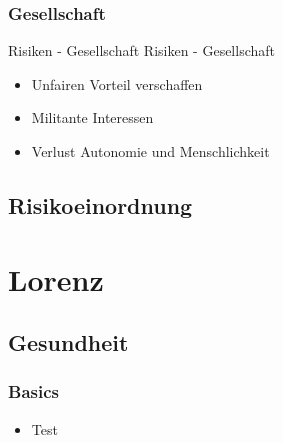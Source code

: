 \documentclass[aspectratio=169,16pt,xcolor=table]{beamer}
\begin{document}
\subsubsection{Gesellschaft}
\begin{frame}{Risiken - Gesellschaft}
Risiken - Gesellschaft
	\begin{itemize}
		\item{Unfairen Vorteil verschaffen~\cite{khan_aziz_2019}}
		\item{Militante Interessen~\cite{khan_aziz_2019}}
		\item{Verlust Autonomie und Menschlichkeit~\cite{Burwell:2017aa}}
	\end{itemize}
\end{frame}

\subsection{Risikoeinordnung}


\newpage
\printbibliography %

\section{Lorenz}
\subsection{Gesundheit}
\begin{frame}
	\frametitle{Basics}
	\begin{itemize}
	\item Test
	\end{itemize}
\end{frame}
\end{document}
